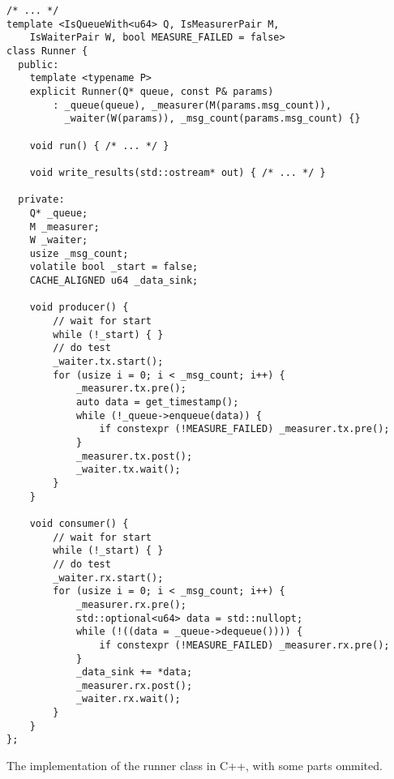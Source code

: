 \begin{listing}
\begin{verbatim}
/* ... */
template <IsQueueWith<u64> Q, IsMeasurerPair M,
    IsWaiterPair W, bool MEASURE_FAILED = false>
class Runner {
  public:
    template <typename P>
    explicit Runner(Q* queue, const P& params)
        : _queue(queue), _measurer(M(params.msg_count)),
          _waiter(W(params)), _msg_count(params.msg_count) {}

    void run() { /* ... */ }

    void write_results(std::ostream* out) { /* ... */ }

  private:
    Q* _queue;
    M _measurer;
    W _waiter;
    usize _msg_count;
    volatile bool _start = false;
    CACHE_ALIGNED u64 _data_sink;

    void producer() {
        // wait for start
        while (!_start) { }
        // do test
        _waiter.tx.start();
        for (usize i = 0; i < _msg_count; i++) {
            _measurer.tx.pre();
            auto data = get_timestamp();
            while (!_queue->enqueue(data)) {
                if constexpr (!MEASURE_FAILED) _measurer.tx.pre();
            }
            _measurer.tx.post();
            _waiter.tx.wait();
        }
    }

    void consumer() {
        // wait for start
        while (!_start) { }
        // do test
        _waiter.rx.start();
        for (usize i = 0; i < _msg_count; i++) {
            _measurer.rx.pre();
            std::optional<u64> data = std::nullopt;
            while (!((data = _queue->dequeue()))) {
                if constexpr (!MEASURE_FAILED) _measurer.rx.pre();
            }
            _data_sink += *data;
            _measurer.rx.post();
            _waiter.rx.wait();
        }
    }
};
\end{verbatim}
\caption{The implementation of the runner class in C++, with some parts ommited.}
\label{fig:runner-class-code}
\end{listing}
